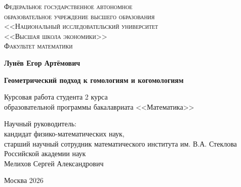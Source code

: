 \begin{titlepage}
\begin{center}
{\scshape Федеральное государственное автономное\\
 образовательное учреждение высшего образования\\
 <<Национальный исследовательский университет\\
 <<Высшая школа экономики>>\\[1ex]
 Факультет математики\par}

\par\vfill

\textbf{\large Лунёв Егор Артёмович}

\vspace{1.5cm}

{\Large\bfseries
Геометрический подход к гомологиям и когомологиям
 \par}

\vspace{1.5cm}

Курсовая работа студента 2 курса\\[1ex]
образовательной программы бакалавриата <<Математика>>
\par\vfill
\noindent\hspace{0.52\textwidth}\parbox[t]{0.48\textwidth}{%
    Научный руководитель:\\[3pt]
    кандидат физико-математических наук,\\
    старший научный сотрудник математического института им. В.А. Стеклова Российской академии наук\\
    Мелихов Сергей Александрович\\[2ex]
}%
\par\vfill
Москва 2026
\end{center}
\end{titlepage}